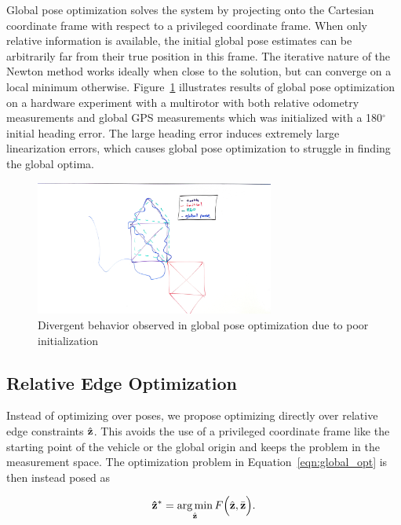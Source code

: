 Global pose optimization solves the system by projecting onto the Cartesian coordinate frame with respect to a privileged coordinate frame. When only relative information is available, the initial global pose estimates can be arbitrarily far from their true position in this frame. The iterative nature of the Newton method works ideally when close to the solution, but can converge on a local minimum otherwise.  Figure~\ref{fig:g2o_baseball_divergence} illustrates results of global pose optimization on a hardware experiment with a multirotor with both relative odometry measurements and global GPS measurements which was initialized with a 180$^\circ$ initial heading error.  The large heading error induces extremely large linearization errors, which causes global pose optimization to struggle in finding the global optima.

\begin{figure}
  \includegraphics[width=0.7\textwidth]{figures/house_g2o_diverged.jpg}
  \caption{Divergent behavior observed in global pose optimization due to poor initialization}
  \label{fig:g2o_baseball_divergence}
\end{figure}


\subsection{Relative Edge Optimization}
Instead of optimizing over poses, we propose optimizing directly over relative edge constraints $\hat{\mathbf{z}}$.  This avoids the use of a privileged coordinate frame like the starting point of the vehicle or the global origin and keeps the problem in the measurement space.  The optimization problem in Equation~\ref{eqn:global_opt} is then instead posed as

\begin{align}
  \mathbf{\hat{\mathbf{z}}}^* = \operatorname*{arg\,min}_{\hat{\mathbf{z}}} F\Big(\hat{\mathbf{z}},\bar{\mathbf{z}} \Big).
  \label{eqn:relative_opt}
\end{align}

